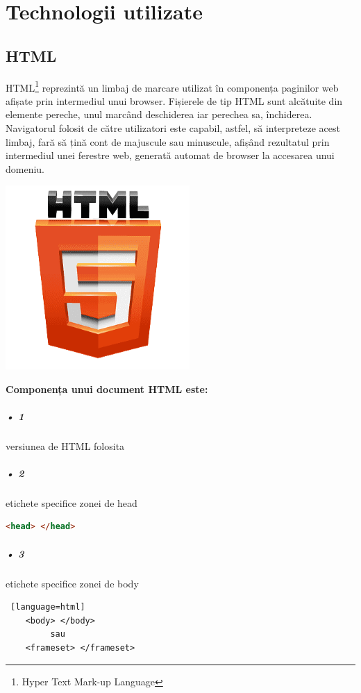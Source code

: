 \chapter{Technologii utilizate}
\section{HTML}

HTML\footnote{Hyper Text Mark-up Language} reprezintă un limbaj de marcare utilizat în componența paginilor web afișate prin intermediul unui browser. Fișierele de tip HTML sunt alcătuite din elemente pereche, unul marcând deschiderea iar perechea sa, închiderea.
Navigatorul folosit de către utilizatori este capabil, astfel, să interpreteze acest limbaj, fară să țină cont de majuscule sau minuscule, afișând rezultatul prin intermediul unei ferestre web, generată automat de browser la accesarea unui domeniu.
\begin{center}
\includegraphics[width=7cm]{./images/html-logo.png}\newline\newline\newline
\end{center}
\textbf{ Componența unui document HTML este:}\newline

\paragraph{• 1} versiunea de HTML folosita
\paragraph{• 2} etichete specifice zonei de head
\begin{lstlisting}[language=html]
	<head> </head>
\end{lstlisting}
\paragraph{• 3} etichete specifice zonei de body
\begin{lstlisting} [language=html]
	<body> </body>
	     sau 
    <frameset> </frameset>
\end{lstlisting}
